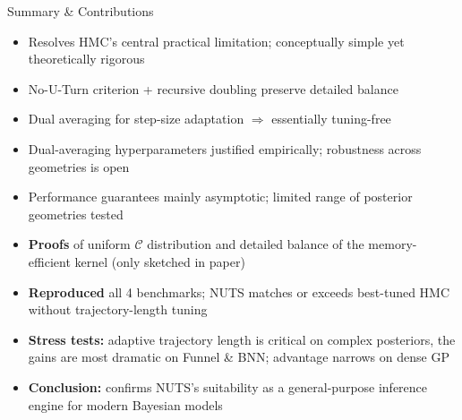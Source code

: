 \documentclass{beamer}
\begin{document}
\begin{frame}{Summary \& Contributions}
  \vspace*{-0.2cm}
  \scriptsize
  \begin{tcolorbox}[warnbox, title=Paper assessment]
    \begin{itemize}\setlength\itemsep{0.05pt}
      \item[\textcolor{green!60!black}{\textbf{+}}] Resolves HMC's central practical limitation; conceptually simple yet theoretically rigorous
      \item[\textcolor{green!60!black}{\textbf{+}}] No-U-Turn criterion + recursive doubling preserve detailed balance
      \item[\textcolor{green!60!black}{\textbf{+}}] Dual averaging for step-size adaptation $\Rightarrow$ essentially tuning-free
      \item[\textcolor{red!70!black}{\textbf{--}}] Dual-averaging hyperparameters justified empirically; robustness across geometries is open
      \item[\textcolor{red!70!black}{\textbf{--}}] Performance guarantees mainly asymptotic; limited range of posterior geometries tested
    \end{itemize} 
  \end{tcolorbox}

  \vspace{-0.1cm}
  \begin{tcolorbox}[keybox, title=Our contributions]
    \begin{itemize}\setlength\itemsep{0.05pt}
      \item \textbf{Proofs} of uniform $\mathcal{C}$ distribution and detailed balance of the memory-efficient kernel (only sketched in paper)
      \item \textbf{Reproduced} all 4 benchmarks; NUTS matches or exceeds best-tuned HMC without trajectory-length tuning
      \item \textbf{Stress tests:} adaptive trajectory length is critical on complex posteriors, the gains are most dramatic on Funnel \& BNN; advantage narrows on dense GP
      \item \textbf{Conclusion:} confirms NUTS's suitability as a general-purpose inference engine for modern Bayesian models
    \end{itemize}
  \end{tcolorbox}
\end{frame}


\begingroup
{} 
\end{document}

